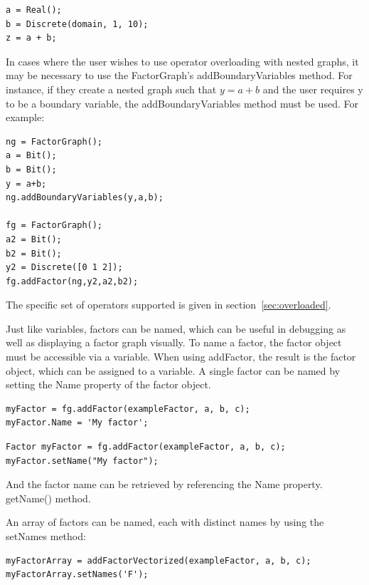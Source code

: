 \begin{lstlisting}
a = Real();
b = Discrete(domain, 1, 10);
z = a + b;					
\end{lstlisting}

In cases where the user wishes to use operator overloading with nested graphs, it may be necessary to use the FactorGraph's addBoundaryVariables method.  For instance, if they create a nested graph such that $y = a+b$ and the user requires y to be a boundary variable, the addBoundaryVariables method must be used.  For example:

\begin{lstlisting}
ng = FactorGraph();
a = Bit();
b = Bit();
y = a+b;
ng.addBoundaryVariables(y,a,b);

fg = FactorGraph();
a2 = Bit();
b2 = Bit();
y2 = Discrete([0 1 2]);
fg.addFactor(ng,y2,a2,b2);
\end{lstlisting}

The specific set of operators supported is given in section~\ref{sec:overloaded}.

\fi



Just like variables, factors can be named, which can be useful in debugging as well as displaying a factor graph visually.  To name a factor, the factor object must be accessible via a variable.  When using addFactor, the result is the factor object, which can be assigned to a variable.  A single factor can be named by setting the Name property of the factor object.

\ifmatlab

\begin{lstlisting}
myFactor = fg.addFactor(exampleFactor, a, b, c);
myFactor.Name = 'My factor';
\end{lstlisting}

\fi

\ifjava
\begin{lstlisting}
Factor myFactor = fg.addFactor(exampleFactor, a, b, c);
myFactor.setName("My factor");
\end{lstlisting}

\fi

And the factor name can be retrieved by referencing the \ifmatlab Name property. \fi \ifjava getName() method. \fi

\ifmatlab

An array of factors can be named, each with distinct names by using the setNames method:

\begin{lstlisting}
myFactorArray = addFactorVectorized(exampleFactor, a, b, c);
myFactorArray.setNames('F');
\end{lstlisting}

